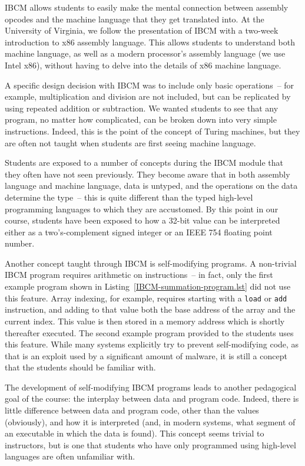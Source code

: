 IBCM allows students to easily make the mental connection between
assembly opcodes and the machine language that they get translated
into.  At the University of Virginia, we follow the presentation of
IBCM with a two-week introduction to x86 assembly language.  This
allows students to understand both machine language, as well as a
modern processor's assembly language (we use Intel x86), without
having to delve into the details of x86 machine language.

A specific design decision with IBCM was to include only basic
operations~-- for example, multiplication and division are not
included, but can be replicated by using repeated addition or
subtraction.  We wanted students to see that any program, no matter
how complicated, can be broken down into very simple instructions.
Indeed, this is the point of the concept of Turing machines, but they
are often not taught when students are first seeing machine language.

Students are exposed to a number of concepts during the IBCM module
that they often have not seen previously.  They become aware that in
both assembly language and machine language, data is untyped, and the
operations on the data determine the type~-- this is quite different
than the typed high-level programming languages to which they are
accustomed.  By this point in our course, students have been exposed
to how a 32-bit value can be interpreted either as a two's-complement
signed integer or an IEEE 754 floating point number.

Another concept taught through IBCM is self-modifying programs.  A
non-trivial IBCM program requires arithmetic on instructions~-- in
fact, only the first example program shown in
Listing~\ref{IBCM-summation-program.lst} did not use this feature.  Array indexing,
for example, requires starting with a {\tt load} or {\tt add}
instruction, and adding to that value both the base address of the
array and the current index.  This value is then stored in a memory
address which is shortly thereafter executed.  The second example
program provided to the students uses this feature.  While many
systems explicitly try to prevent self-modifying code, as that is an
exploit used by a significant amount of malware, it is still a concept
that the students should be familiar with.

The development of self-modifying IBCM programs leads to another
pedagogical goal of the course: the interplay between data and program
code.  Indeed, there is little difference between data and program
code, other than the values (obviously), and how it is interpreted
(and, in modern systems, what segment of an executable in which the
data is found).  This concept seems trivial to instructors, but is one
that students who have only programmed using high-level languages are
often unfamiliar with.

